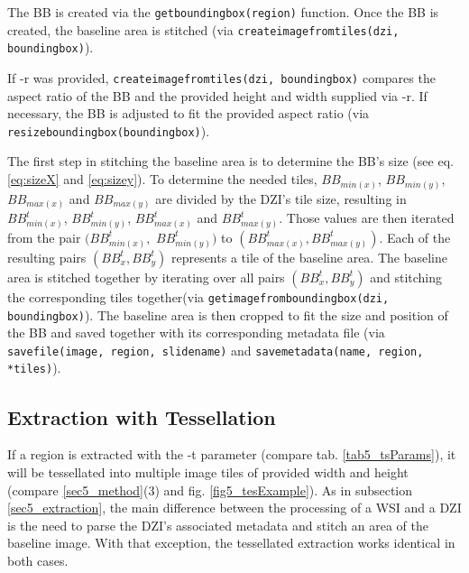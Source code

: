 The BB is created via the \texttt{get{\textunderscore}bounding{\textunderscore}box(region)} function. Once the BB is created, the baseline area is stitched (via \texttt{create{\textunderscore}image{\textunderscore}from{\textunderscore}tiles({\allowbreak}dzi, bounding{\textunderscore}box)}). 

If -r was provided, \texttt{create{\textunderscore}image{\textunderscore}from{\textunderscore}tiles({\allowbreak}dzi, bounding{\textunderscore}box)} compares the aspect ratio of the BB and the provided height and width supplied via -r.  If necessary, the BB is adjusted to fit the provided aspect ratio (via \texttt{resize{\textunderscore}bounding{\textunderscore}box(bounding{\textunderscore}box)}).
 
The first step in stitching the baseline area is to determine the BB's size (see eq. \ref{eq:sizeX} and \ref{eq:sizey}). To determine the needed tiles, $BB_{min(x)}$, $BB_{min(y)}$, $BB_{max(x)}$ and $BB_{max(y)}$ are divided by the DZI's tile size, resulting in $BB_{min(x)}^t$, $BB_{min(y)}^t$, $BB_{max(x)}^t$ and $BB_{max(y)}^t$. Those values are then iterated from the pair $(BB_{min(x)}^t,$ $BB_{min(y)}^t)$ to $(BB_{max(x)}^t, BB_{max(y)}^t)$. Each of the resulting pairs $(BB_x^t, BB_y^t)$ represents a tile of the baseline area. The baseline area is stitched together by iterating over all pairs $(BB_x^t, BB_y^t)$ and stitching the corresponding tiles together(via \texttt{get{\textunderscore}image{\textunderscore}from{\textunderscore}bounding{\textunderscore}box(dzi, bounding{\textunderscore}box)}). The baseline area is then cropped to fit the size and position of the BB and saved together with its corresponding metadata file (via \texttt{save{\textunderscore}file(image, region, slide{\textunderscore}name)} and \texttt{save{\textunderscore}metadata(name, region, *tiles)}).


\subsection{Extraction with Tessellation}
\label{sec5_tessellation}

If a region is extracted with the -t parameter (compare tab. \ref{tab5_tsParams}), it will be tessellated into multiple image tiles of provided width and height (compare \ref{sec5_method}(3) and fig. \ref{fig5_tesExample}). As in subsection \ref{sec5_extraction}, the main difference between the processing of a WSI and a DZI is the need to parse the DZI's associated metadata and stitch an area of the baseline image. With that exception, the tessellated extraction works identical in both cases.

